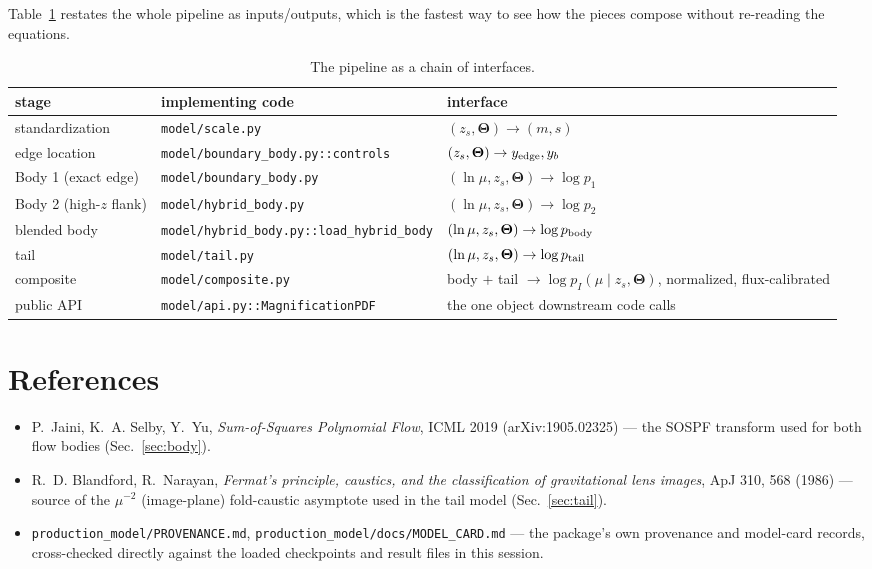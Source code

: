 \documentclass[11pt]{article}
\newcommand{\file}[1]{\texttt{#1}}
\newcommand{\vect}[1]{\boldsymbol{#1}}
\begin{document}
Table~\ref{tab:chain} restates the whole pipeline as inputs/outputs, which
is the fastest way to see how the pieces compose without re-reading the
equations.

\begin{table}[h]
\centering
\small
\begin{tabular}{p{3.1cm}p{5.4cm}p{5.8cm}}
\toprule
stage & implementing code & interface \\
\midrule
standardization & \file{model/scale.py} & $(z_s,\vect\Theta)\to (m,s)$ \\
edge location & \file{model/boundary\_body.py::controls} & $(z_s,\vect\Theta)\to y_{\rm edge}, y_b$ \\
Body 1 (exact edge) & \file{model/boundary\_body.py} & $(\ln\mu,z_s,\vect\Theta) \to \log p_1$ \\
Body 2 (high-$z$ flank) & \file{model/hybrid\_body.py} & $(\ln\mu,z_s,\vect\Theta) \to \log p_2$ \\
blended body & \file{model/hybrid\_body.py::load\_hybrid\_body} & $(\ln\mu,z_s,\vect\Theta) \to \log p_{\rm body}$ \\
tail & \file{model/tail.py} & $(\ln\mu,z_s,\vect\Theta) \to \log p_{\rm tail}$ \\
composite & \file{model/composite.py} & body $+$ tail $\to \log p_I(\mu\mid z_s,\vect\Theta)$, normalized, flux-calibrated \\
public API & \file{model/api.py::MagnificationPDF} & the one object downstream code calls \\
\bottomrule
\end{tabular}
\caption{The pipeline as a chain of interfaces.}
\label{tab:chain}
\end{table}

\section{References}

\begin{itemize}
 \item P.~Jaini, K.~A. Selby, Y.~Yu, \emph{Sum-of-Squares Polynomial Flow},
   ICML 2019 (arXiv:1905.02325) — the SOSPF transform used for both flow
   bodies (Sec.~\ref{sec:body}).
 \item R.~D. Blandford, R.~Narayan, \emph{Fermat's principle,
   caustics, and the classification of gravitational lens images}, ApJ
   310, 568 (1986) — source of the $\mu^{-2}$ (image-plane) fold-caustic
   asymptote used in the tail model (Sec.~\ref{sec:tail}).
 \item \file{production\_model/PROVENANCE.md},
   \file{production\_model/docs/MODEL\_CARD.md} — the package's own
   provenance and model-card records, cross-checked directly against the
   loaded checkpoints and result files in this session.
\end{itemize}
\end{document}
